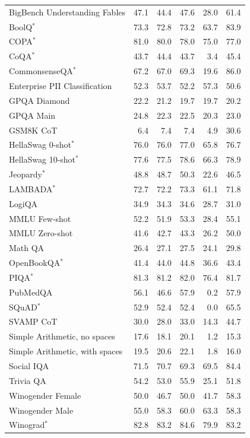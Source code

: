 \documentclass{article}
\begin{document}
\begin{table}[htbp]
\begin{tabular}{l|rrr|rr}
BigBench Understanding Fables & 47.1 & 44.4 & 47.6 & 28.0 & 61.4 \\
BoolQ$^*$ & 73.3 & 72.8 & 73.2 & 63.7 & 83.9 \\
COPA$^*$ & 81.0 & 80.0 & 78.0 & 75.0 & 77.0 \\
CoQA$^*$ & 43.7 & 44.4 & 43.7 & 3.4 & 45.4 \\
CommonsenseQA$^*$ & 67.2 & 67.0 & 69.3 & 19.6 & 86.0 \\
Enterprise PII Classification & 52.3 & 53.7 & 52.2 & 57.3 & 50.6 \\
GPQA Diamond & 22.2 & 21.2 & 19.7 & 19.7 & 20.2 \\
GPQA Main & 24.8 & 22.3 & 22.5 & 20.3 & 23.0 \\
GSM8K CoT & 6.4 & 7.4 & 7.4 & 4.9 & 30.6 \\
HellaSwag 0-shot$^*$ & 76.0 & 76.0 & 77.0 & 65.8 & 76.7 \\
HellaSwag 10-shot$^*$ & 77.6 & 77.5 & 78.6 & 66.3 & 78.9 \\
Jeopardy$^*$ & 48.8 & 48.7 & 50.3 & 22.6 & 46.5 \\
LAMBADA$^*$ & 72.7 & 72.2 & 73.3 & 61.1 & 71.8 \\
LogiQA & 34.9 & 34.3 & 34.6 & 28.7 & 31.0 \\
MMLU Few-shot & 52.2 & 51.9 & 53.3 & 28.4 & 55.1 \\
MMLU Zero-shot & 41.6 & 42.7 & 43.3 & 26.2 & 50.0 \\
Math QA & 26.4 & 27.1 & 27.5 & 24.1 & 29.8 \\
OpenBookQA$^*$ & 41.4 & 44.0 & 44.8 & 36.6 & 43.4 \\
PIQA$^*$ & 81.3 & 81.2 & 82.0 & 76.4 & 81.7 \\
PubMedQA & 56.1 & 46.6 & 57.9 & 0.2 & 57.9 \\
SQuAD$^*$ & 52.9 & 52.4 & 52.4 & 0.0 & 65.5 \\
SVAMP CoT & 30.0 & 28.0 & 33.0 & 14.3 & 44.7 \\
Simple Arithmetic, no spaces & 17.6 & 18.1 & 20.1 & 1.2 & 15.3 \\
Simple Arithmetic, with spaces & 19.5 & 20.6 & 22.1 & 1.8 & 16.0 \\
Social IQA & 71.5 & 70.7 & 69.3 & 69.5 & 84.4 \\
Trivia QA & 54.2 & 53.0 & 55.9 & 25.1 & 51.8 \\
Winogender Female & 50.0 & 46.7 & 50.0 & 41.7 & 58.3 \\
Winogender Male & 55.0 & 58.3 & 60.0 & 63.3 & 58.3 \\
Winograd$^*$ & 82.8 & 83.2 & 84.6 & 79.9 & 83.2 \\

\end{tabular}
\end{table}
\end{document}
